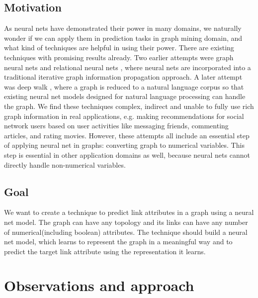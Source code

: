 \documentclass{article}
\begin{document}
\subsection{Motivation}
As neural nets have demonstrated their power in many domains, we naturally 
wonder if we can apply them in prediction tasks in graph mining domain, and 
what kind of techniques are helpful in using their power.
There are existing techniques with promising results already.
Two earlier attempts were graph neural nets and relational neural 
nets \cite{scarselli2009graph}, where neural nets are incorporated into a 
traditional iterative graph information propagation approach.
A later attempt was deep walk \cite{perozzi2014deepwalk}, where a graph is 
reduced to a natural language corpus so that existing neural net models 
designed for natural language processing can handle the graph.
We find these techniques complex, indirect and unable to fully use rich graph 
information in real applications, e.g. making recommendations for social 
network users based on user activities like messaging friends, commenting 
articles, and rating movies.
However, these attempts all include an essential step of applying neural net in 
graphs: converting graph to numerical variables.
This step is essential in other application domains as well, because neural 
nets cannot directly handle non-numerical variables.

\subsection{Goal}
We want to create a technique to predict link attributes in a graph using a 
neural net model. The graph can have any topology and its links can have any 
number of numerical(including boolean) attributes. The technique should build a 
neural net model, which learns to represent the graph in a meaningful way and 
to predict the target link attribute using the representation it learns.

\section{Observations and approach}
\end{document}
